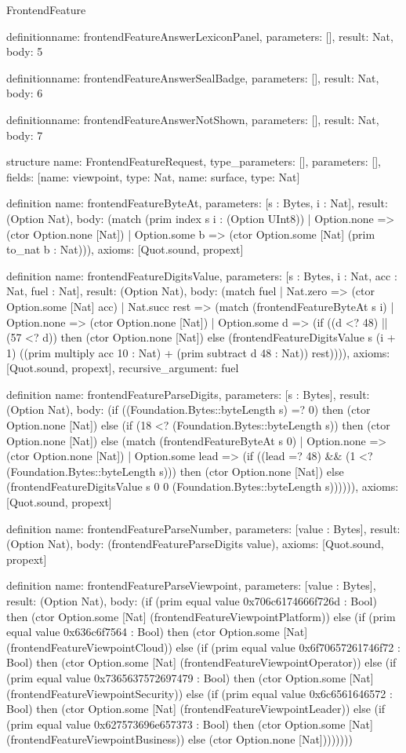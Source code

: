 \begin{lexlean}{FrontendFeature}
\begin{semanticmodule}
definition{name: frontendFeatureAnswerLexiconPanel, parameters: [], result: Nat, body: 5}

definition{name: frontendFeatureAnswerSealBadge, parameters: [], result: Nat, body: 6}

definition{name: frontendFeatureAnswerNotShown, parameters: [], result: Nat, body: 7}

structure{
  name: FrontendFeatureRequest,
  type_parameters: [],
  parameters: [],
  fields: [{name: viewpoint, type: Nat}, {name: surface, type: Nat}]
}

definition{
  name: frontendFeatureByteAt,
  parameters: [s : Bytes, i : Nat],
  result: (Option Nat),
  body: (match (prim index s i : (Option UInt8))
    | Option.none => (ctor Option.none [Nat])
    | Option.some b => (ctor Option.some [Nat] (prim to_nat b : Nat))),
  axioms: [Quot.sound, propext]
}

definition{
  name: frontendFeatureDigitsValue,
  parameters: [s : Bytes, i : Nat, acc : Nat, fuel : Nat],
  result: (Option Nat),
  body: (match fuel
    | Nat.zero => (ctor Option.some [Nat] acc)
    | Nat.succ rest => (match (frontendFeatureByteAt s i)
      | Option.none => (ctor Option.none [Nat])
      | Option.some d => (if ((d <? 48) || (57 <? d)) then (ctor Option.none [Nat]) else (frontendFeatureDigitsValue s (i + 1) ((prim multiply acc 10 : Nat) + (prim subtract d 48 : Nat)) rest)))),
  axioms: [Quot.sound, propext],
  recursive_argument: fuel
}

definition{
  name: frontendFeatureParseDigits,
  parameters: [s : Bytes],
  result: (Option Nat),
  body: (if ((Foundation.Bytes::byteLength s) =? 0) then (ctor Option.none [Nat]) else (if (18 <? (Foundation.Bytes::byteLength s)) then (ctor Option.none [Nat]) else (match (frontendFeatureByteAt s 0)
    | Option.none => (ctor Option.none [Nat])
    | Option.some lead => (if ((lead =? 48) && (1 <? (Foundation.Bytes::byteLength s))) then (ctor Option.none [Nat]) else (frontendFeatureDigitsValue s 0 0 (Foundation.Bytes::byteLength s)))))),
  axioms: [Quot.sound, propext]
}

definition{
  name: frontendFeatureParseNumber,
  parameters: [value : Bytes],
  result: (Option Nat),
  body: (frontendFeatureParseDigits value),
  axioms: [Quot.sound, propext]
}

definition{
  name: frontendFeatureParseViewpoint,
  parameters: [value : Bytes],
  result: (Option Nat),
  body: (if (prim equal value 0x706c6174666f726d : Bool) then (ctor Option.some [Nat] (frontendFeatureViewpointPlatform)) else (if (prim equal value 0x636c6f7564 : Bool) then (ctor Option.some [Nat] (frontendFeatureViewpointCloud)) else (if (prim equal value 0x6f70657261746f72 : Bool) then (ctor Option.some [Nat] (frontendFeatureViewpointOperator)) else (if (prim equal value 0x7365637572697479 : Bool) then (ctor Option.some [Nat] (frontendFeatureViewpointSecurity)) else (if (prim equal value 0x6c6561646572 : Bool) then (ctor Option.some [Nat] (frontendFeatureViewpointLeader)) else (if (prim equal value 0x627573696e657373 : Bool) then (ctor Option.some [Nat] (frontendFeatureViewpointBusiness)) else (ctor Option.none [Nat])))))))
}


\end{semanticmodule}
\end{lexlean}

